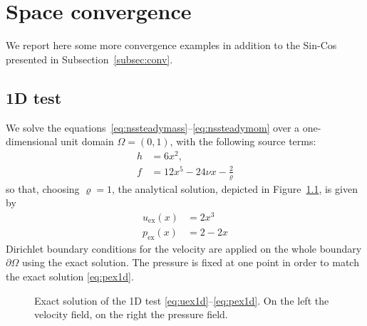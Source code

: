 \appendix
\renewcommand{\chaptername}{Appendix}
\chapter{Space convergence} \label{app:conv}
We report here some more convergence examples in addition to the Sin-Cos 
presented in Subsection~\ref{subsec:conv}.
%
\section{1D test}
We solve the equations~\eqref{eq:nssteadymass}--\eqref{eq:nssteadymom} over a 
one-dimensional unit domain $\Omega=(0,1)$, with the following source terms:
\begin{align}
	h &= 6x^2,\\
	f &= 12x^5 - 24\nu x - \frac{2}{\varrho} %
\end{align}
so that, choosing $\varrho=1$, the analytical solution, depicted in 
Figure~\ref{fig:1dexact}, is given by
\begin{align}
\label{eq:uex1d}	u_\text{ex}(x) &= 2x^3\\
\label{eq:pex1d}	p_\text{ex}(x) &= 2-2x
\end{align}
Dirichlet boundary conditions for the velocity are applied on the whole 
boundary $\partial \Omega$ using the exact solution. The pressure is fixed at 
one point in order to match the exact solution \eqref{eq:pex1d}.
\begin{figure}
	\centering
	\caption[Exact solution of the 1D test]{Exact solution of the 1D test 
	\eqref{eq:uex1d}--\eqref{eq:pex1d}. On 
	the left the velocity field, on the right the pressure field.}
	\label{fig:1dexact}
\end{figure}

